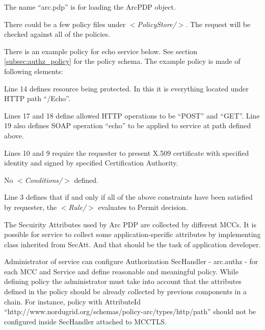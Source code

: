 \documentclass{article}                            %
\begin{document}
The name ``arc.pdp'' is for loading the ArcPDP object.

There could be a few policy files under \textit{$<$PolicyStore/$>$}. The request will be checked against all of the policies.

There is an example policy for echo service below. See section \ref{subsec:authz_policy} for the policy schema. The example policy is  made of following elements:

  \begin{list}{.}
  {\setlength{\rightmargin}{\leftmargin}}
    \item Line 14  defines resource being protected. In this it is everything located under HTTP path ``/Echo''.
    \item Lines 17 and 18 define allowed HTTP operations to be ``POST'' and ``GET''. Line 19 also defines SOAP operation ``echo'' to be applied to service at path defined above.
    \item Lines 10 and 9 require the requester to present X.509 certificate with specified identity and signed by specified Certification Authority.
    \item No \textit{$<$Conditions/$>$} defined.
    \item Line 3 defines that if and only if all of the above constraints have been satisfied by requester, the \textit{$<$Rule/$>$} evaluates to Permit decision.
  \end{list}

The Secuirity Attributes used by Arc PDP are collected by different MCCs. It is possible for service to collect some application-specific attributes by implementing class inherited from SecAtt. And that should be the task of application developer.

Administrator of service can configure Authorization SecHandler - arc.authz - for each MCC and Service and define reasonable and meaningful policy. While defining policy the administrator must take into account that the attributes defined in the policy should be already collected by previous components in a chain. For instance, policy with AttributeId ``http://www.nordugrid.org/schemas/policy-arc/types/http/path'' should not be configured inside SecHandler attached to MCCTLS.
\end{document}
